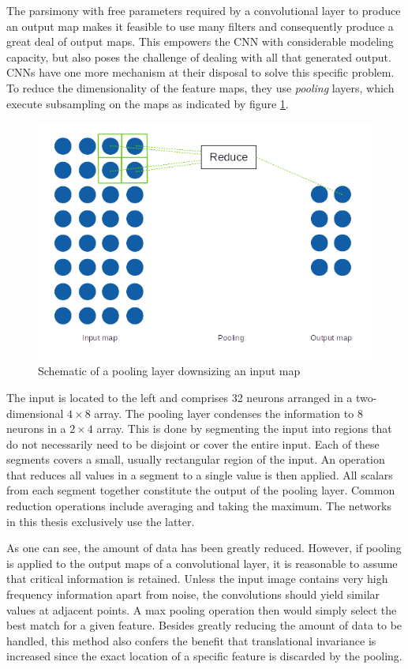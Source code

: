 \documentclass[11pt, a4paper]{article}
\begin{document}
The parsimony with free parameters required by a convolutional layer to produce an output map makes it feasible to use many filters and consequently produce a great deal of output maps. This empowers the CNN with considerable modeling capacity, but also poses the challenge of dealing with all that generated output. CNNs have one more mechanism at their disposal to solve this specific problem. To reduce the dimensionality of the feature maps, they use \emph{pooling} layers, which execute subsampling on the maps as indicated by figure \ref{fig:pooling-layer}.

\begin{figure}[h!tb]
	\centering
	\includegraphics{images/pooling_layer.png}
	\caption[Pooling layer functionality]{Schematic of a pooling layer downsizing an input map}
	\label{fig:pooling-layer}
\end{figure}

The input is located to the left and comprises 32 neurons arranged in a two-dimensional $4 \times 8$ array. The pooling layer condenses the information to 8 neurons in a $2 \times 4$ array. This is done by segmenting the input into regions that do not necessarily need to be disjoint or cover the entire input. Each of these segments covers a small, usually rectangular region of the input. An operation that reduces all values in a segment to a single value is then applied. All scalars from each segment together constitute the output of the pooling layer. Common reduction operations include averaging and taking the maximum. The networks in this thesis exclusively use the latter.

As one can see, the amount of data has been greatly reduced. However, if pooling is applied to the output maps of a convolutional layer, it is reasonable to assume that critical information is retained. Unless the input image contains very high frequency information apart from noise, the convolutions should yield similar values at adjacent points. A max pooling operation then would simply select the best match for a given feature. Besides greatly reducing the amount of data to be handled, this method also confers the benefit that translational invariance is increased since the exact location of a specific feature is discarded by the pooling.
\end{document}
